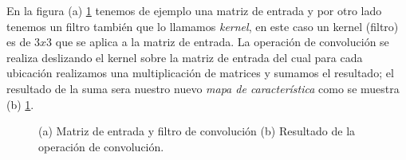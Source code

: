 En la figura (a) \ref{Fig:filter} tenemos de ejemplo una matriz de entrada y por otro lado tenemos un filtro también que lo llamamos \textit{kernel}, en este caso un kernel (filtro) es de $3x3$ que se aplica a la matriz de entrada. La operación de convolución se realiza deslizando el kernel sobre la matriz de entrada del cual para cada ubicación realizamos una multiplicación de matrices y sumamos el resultado; el resultado de la suma sera nuestro nuevo \textit{mapa de característica} como se muestra (b) \ref{Fig:filter}.

\begin{figure}[htbp]
\centering
{}%

\caption{(a) Matriz de entrada y filtro de convolución (b) Resultado de la operación de convolución.}\label{Fig:filter}
\end{figure}


